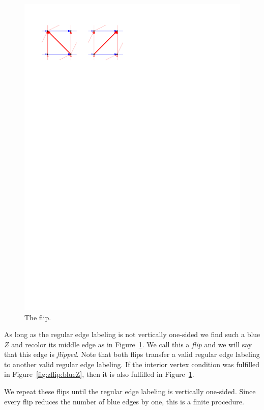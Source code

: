\begin{figure}[!b]
    \includegraphics[scale=1]{unifiedAlgo/img/zflip/flip.pdf}
    \caption{The flip.}
    \label{fig:zflip:flip}
  \end{figure}

  As long as the regular edge labeling is not vertically one-sided we find such a blue $Z$ and recolor its middle edge as in Figure~\ref{fig:zflip:flip}. We call this a \emph{flip} and we will say that this edge is \emph{flipped}.
  Note that both flips transfer a valid regular edge labeling to another valid regular edge labeling. If the interior vertex condition was fulfilled in Figure~\ref{fig:zflip:blueZ}, then it is also fulfilled in Figure~\ref{fig:zflip:flip}.

  We repeat these flips until the regular edge labeling is vertically one-sided.
  Since every flip reduces the number of blue edges by one, this is a finite procedure.


